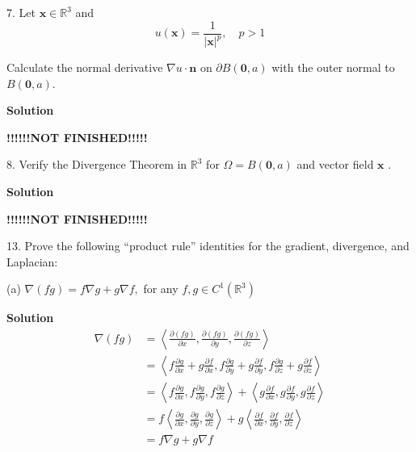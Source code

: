 \documentclass{article}
\begin{document}
\vspace{5mm}
7. Let $\mathbf{x} \in \mathbb{R}^{3}$ and
$$u(\mathbf{x}) = \frac{1}{|\mathbf{x}|^{p}}, \quad p>1$$

Calculate the normal derivative $\nabla u \cdot \mathbf{n}$ on $\partial
B(\mathbf{0}, a)$ with the outer normal to $B(\mathbf{0}, a)$.

\textbf{Solution}

\quad \textbf{!!!!!!NOT FINISHED!!!!!}

\vspace{5mm}
8. Verify the Divergence Theorem in $\mathbb{R}^{3}$ for
$\Omega = B(\mathbf{0}, a)$ and vector field $\mathbf{x}$ .

\textbf{Solution}

\quad \textbf{!!!!!!NOT FINISHED!!!!!}

\vspace{5mm}
13. Prove the following ``product rule'' identities for the gradient,
divergence, and Laplacian:

(a) $\nabla(f g) = f \nabla g + g \nabla f,$ for any
$f, g \in C^{1}\left(\mathbb{R}^{3}\right)$

\textbf{Solution}
%
\begin{align*}
    \nabla (f g)
        &= \left\langle
                \frac{\partial (f g)}{\partial x},
                \frac{\partial (f g)}{\partial y},
                \frac{\partial (f g)}{\partial z}
           \right\rangle \\
        &= \left\langle
                f \frac{\partial g}{\partial x} + g \frac{\partial f}{\partial x},
                f \frac{\partial g}{\partial y} + g \frac{\partial f}{\partial y},
                f \frac{\partial g}{\partial z} + g \frac{\partial f}{\partial z}
           \right\rangle \\
        &= \left\langle
                f \frac{\partial g}{\partial x},
                f \frac{\partial g}{\partial y},
                f \frac{\partial g}{\partial z}
           \right\rangle
           +
           \left\langle
                g \frac{\partial f}{\partial x},
                g \frac{\partial f}{\partial y},
                g \frac{\partial f}{\partial z}
           \right\rangle \\
        &= f \left\langle
                \frac{\partial g}{\partial x},
                \frac{\partial g}{\partial y},
                \frac{\partial g}{\partial z}
           \right\rangle
           +
           g \left\langle
                \frac{\partial f}{\partial x},
                \frac{\partial f}{\partial y},
                \frac{\partial f}{\partial z}
           \right\rangle \\
        &= f \nabla g + g \nabla f
\end{align*}
\end{document}
